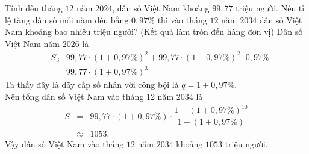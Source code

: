 \begin{ex}%
	Tính đến tháng $12$ năm $2024$, dân số Việt Nam khoảng $99{,}77$ triệu người. Nếu tỉ lệ tăng dân số mỗi năm đều bằng $0{,}97\%$ thì vào tháng $12$ năm $2034$ dân số Việt Nam khoảng bao nhiêu triệu người? (Kết quả làm tròn đến hàng đơn vị)
	Dân số Việt Nam năm $2026$ là \allowdisplaybreaks
	\begin{eqnarray*}
		&S_3&99{,}77\cdot\left(1+0{,}97\%\right)^2+99{,}77\cdot\left(1+0{,}97\%\right)^2\cdot 0{,}97\%\\
		&=&99{,}77\cdot\left(1+0{,}97\%\right)^3
	\end{eqnarray*}
	Ta thấy đây là dãy cấp số nhân với công bội là $q=1+0{,}97\%$.\\
	Nên tổng dân số Việt Nam vào tháng 12 năm $2034$ là \allowdisplaybreaks
	\begin{eqnarray*}
		S&=&99{,}77\cdot\left(1+0{,}97\%\right)\cdot\dfrac{1-\left(1+0{,}97\%\right)^{10}}{1-\left(1+0{,}97\%\right)}\\
		&\approx& 1053.
	\end{eqnarray*}
	Vậy dân số Việt Nam vào tháng $12$ năm $2034$ khoảng $1053$ triệu người.
\end{ex}


